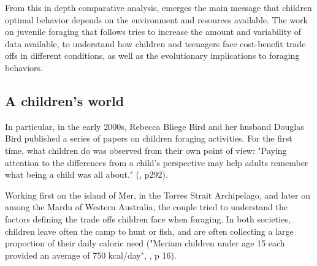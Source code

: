 From this in depth comparative analysis, emerges the main message that children optimal behavior depends on the environment and resources available. The work on juvenile foraging that follows tries to increase the amount and variability of data available, to understand how children and teenagers face cost-benefit trade offs in different conditions, as well as the evolutionary implications to foraging behaviors.


\subsection{A children's world}

In particular, in the early 2000s, Rebecca Bliege Bird and her husband Douglas Bird published a series of papers on children foraging activities. For the first time, what children do was observed from their own point of view: "Paying attention to the differences from a child's perspective may help adults remember what being a child was all about." (\cite{bird_children_2002}, p292).

Working first on the island of Mer, in the Torres Strait Archipelago, and later on among the Mardu of Western Australia, the couple tried to understand the factors defining the trade offs children face when foraging. In both societies, children leave often the camp to hunt or fish, and are often collecting a large proportion of their daily caloric need ("Meriam children under age 15 each provided an average of 750 kcal/day", \cite{bliege_bird_children_1995}, p 16).

